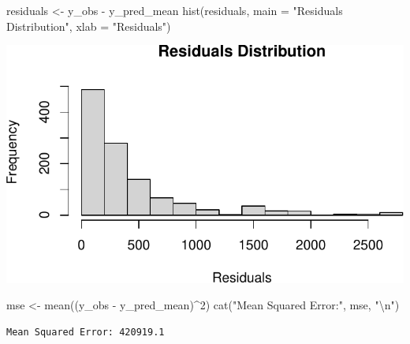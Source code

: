 \documentclass[
  12pt,
]{article}
\newenvironment{Shaded}{\begin{snugshade}}{\end{snugshade}}
\newcommand{\AttributeTok}[1]{\textcolor[rgb]{0.40,0.45,0.13}{#1}}
\newcommand{\CommentTok}[1]{\textcolor[rgb]{0.37,0.37,0.37}{#1}}
\newcommand{\ControlFlowTok}[1]{\textcolor[rgb]{0.00,0.23,0.31}{\textbf{#1}}}
\newcommand{\DecValTok}[1]{\textcolor[rgb]{0.68,0.00,0.00}{#1}}
\newcommand{\FunctionTok}[1]{\textcolor[rgb]{0.28,0.35,0.67}{#1}}
\newcommand{\NormalTok}[1]{\textcolor[rgb]{0.00,0.23,0.31}{#1}}
\newcommand{\OtherTok}[1]{\textcolor[rgb]{0.00,0.23,0.31}{#1}}
\newcommand{\SpecialCharTok}[1]{\textcolor[rgb]{0.37,0.37,0.37}{#1}}
\newcommand{\StringTok}[1]{\textcolor[rgb]{0.13,0.47,0.30}{#1}}
\begin{document}
\begin{Shaded}
\begin{Highlighting}[]
\NormalTok{residuals }\OtherTok{\textless{}{-}}\NormalTok{ y\_obs }\SpecialCharTok{{-}}\NormalTok{ y\_pred\_mean}
\FunctionTok{hist}\NormalTok{(residuals, }\AttributeTok{main =} \StringTok{"Residuals Distribution"}\NormalTok{, }\AttributeTok{xlab =} \StringTok{"Residuals"}\NormalTok{)}
\end{Highlighting}
\end{Shaded}

\includegraphics{final_main_quarto_presentation_files/figure-pdf/unnamed-chunk-25-2.pdf}

\begin{Shaded}
\begin{Highlighting}[]
\NormalTok{mse }\OtherTok{\textless{}{-}} \FunctionTok{mean}\NormalTok{((y\_obs }\SpecialCharTok{{-}}\NormalTok{ y\_pred\_mean)}\SpecialCharTok{\^{}}\DecValTok{2}\NormalTok{)}
\FunctionTok{cat}\NormalTok{(}\StringTok{"Mean Squared Error:"}\NormalTok{, mse, }\StringTok{"}\SpecialCharTok{\textbackslash{}n}\StringTok{"}\NormalTok{)}
\end{Highlighting}
\end{Shaded}

\begin{verbatim}
Mean Squared Error: 420919.1 
\end{verbatim}

\begin{Shaded}
\end{Shaded}
\end{document}
